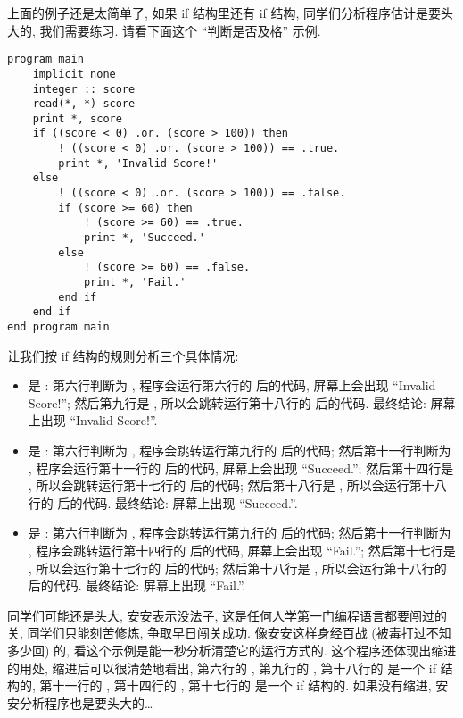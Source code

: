 上面的例子还是太简单了, 如果 if 结构里还有 if 结构, 同学们分析程序估计是要头大的, 我们需要练习. 请看下面这个 ``判断是否及格'' 示例. \label{whether_passed}
\begin{lstlisting}
program main
    implicit none
    integer :: score
    read(*, *) score
    print *, score
    if ((score < 0) .or. (score > 100)) then
        ! ((score < 0) .or. (score > 100)) == .true.
        print *, 'Invalid Score!'
    else
        ! ((score < 0) .or. (score > 100)) == .false.
        if (score >= 60) then
            ! (score >= 60) == .true.
            print *, 'Succeed.'
        else
            ! (score >= 60) == .false.
            print *, 'Fail.'
        end if
    end if
end program main
\end{lstlisting}
让我们按 if 结构的规则分析三个具体情况:
\begin{itemize}
    \item {} 是 : 第六行判断为 , 程序会运行第六行的  后的代码, 屏幕上会出现 ``Invalid Score!''; 然后第九行是 , 所以会跳转运行第十八行的  后的代码. 最终结论: 屏幕上出现 ``Invalid Score!''.
    \item {} 是 : 第六行判断为 , 程序会跳转运行第九行的  后的代码; 然后第十一行判断为 , 程序会运行第十一行的  后的代码, 屏幕上会出现 ``Succeed.''; 然后第十四行是 , 所以会跳转运行第十七行的  后的代码; 然后第十八行是 , 所以会运行第十八行的  后的代码. 最终结论: 屏幕上出现 ``Succeed.''.
    \item {} 是 : 第六行判断为 , 程序会跳转运行第九行的  后的代码; 然后第十一行判断为 , 程序会跳转运行第十四行的  后的代码, 屏幕上会出现 ``Fail.''; 然后第十七行是 , 所以会运行第十七行的  后的代码; 然后第十八行是 , 所以会运行第十八行的  后的代码. 最终结论: 屏幕上出现 ``Fail.''.
\end{itemize}
同学们可能还是头大, 安安表示没法子, 这是任何人学第一门编程语言都要闯过的关, 同学们只能刻苦修炼, 争取早日闯关成功. 像安安这样身经百战 (被毒打过不知多少回) 的, 看这个示例是能一秒分析清楚它的运行方式的. 这个程序还体现出缩进的用处, 缩进后可以很清楚地看出, 第六行的 , 第九行的 , 第十八行的  是一个 if 结构的, 第十一行的 , 第十四行的 , 第十七行的  是一个 if 结构的. 如果没有缩进, 安安分析程序也是要头大的\dots{}

